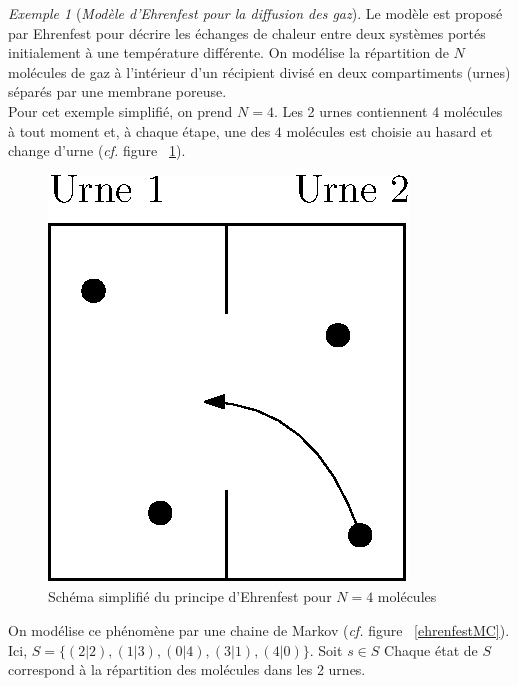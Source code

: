 \documentclass[12pt,a4paper]{report}
\theoremstyle{definition}
\theoremstyle{remark}
\newtheorem{example}{Exemple}[chapter]
\newcommand{\cf}{\textit{cf.} }
\begin{document}
\begin{example}[\textit{Modèle d'Ehrenfest pour la diffusion des gaz}]
	Le modèle est proposé par Ehrenfest pour décrire les échanges de chaleur entre deux systèmes portés initialement à une température différente. On modélise la répartition de $N$ molécules de gaz à l'intérieur d'un récipient divisé en deux compartiments (urnes) séparés par une membrane poreuse.\\
	Pour cet exemple simplifié, on prend $N = 4$. Les 2 urnes contiennent $4$ molécules à tout moment et, à chaque étape, une des $4$ molécules est choisie au hasard et change d'urne (\cf figure ~\ref{ehrenfestscheme}).
	\begin{figure}[H]
		\centering
		\includegraphics[scale=0.5]{figures/EhrenfestUrne.eps}
		\caption{Schéma simplifié du principe d'Ehrenfest pour $N=4$ molécules}
		\label{ehrenfestscheme}
	\end{figure}
	On modélise ce phénomène par une chaine de Markov (\cf figure ~\ref{ehrenfestMC}). Ici, $S=\{(2|2), (1|3), (0|4), (3|1), (4|0) \}$. Soit $s \in S$ 
	Chaque état de $S$ correspond à la répartition des molécules dans les 2 urnes.
	\begin{figure}[H]
		\centering

\end{figure}
\end{example}
\end{document}
